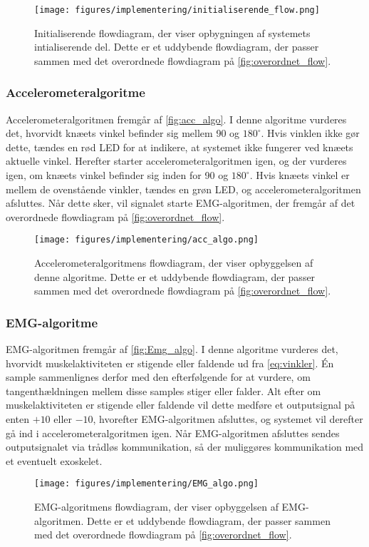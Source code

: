 \begin{figure}[H]
\centering
\texttt{[image: figures/implementering/initialiserende\_flow.png]}
\caption{Initialiserende flowdiagram, der viser opbygningen af systemets intialiserende del. Dette er et uddybende flowdiagram, der passer sammen med det overordnede flowdiagram på \autoref{fig:overordnet_flow}.}
\label{fig:initialiserende_flow}
\end{figure}

\subsubsection{Accelerometeralgoritme}
Accelerometeralgoritmen fremgår af \autoref{fig:acc_algo}. I denne algoritme vurderes det, hvorvidt knæets vinkel befinder sig mellem 90 og $180^{\circ}$. Hvis vinklen ikke gør dette, tændes en rød LED for at indikere, at systemet ikke fungerer ved knæets aktuelle vinkel. Herefter starter accelerometeralgoritmen igen, og der vurderes igen, om knæets vinkel befinder sig inden for 90 og $180^{\circ}$. Hvis knæets vinkel er mellem de ovenstående vinkler, tændes en grøn LED, og accelerometeralgoritmen afsluttes. Når dette sker, vil signalet starte EMG-algoritmen, der fremgår af det overordnede flowdiagram på \autoref{fig:overordnet_flow}.

\begin{figure}[H]
\centering
\texttt{[image: figures/implementering/acc\_algo.png]}
\caption{Accelerometeralgoritmens flowdiagram, der viser opbyggelsen af denne algoritme. Dette er et uddybende flowdiagram, der passer sammen med det overordnede flowdiagram på \autoref{fig:overordnet_flow}.}
\label{fig:acc_algo}
\end{figure}

\subsubsection{EMG-algoritme}
EMG-algoritmen fremgår af \autoref{fig:Emg_algo}. 
I denne algoritme vurderes det, hvorvidt muskelaktiviteten er stigende eller faldende ud fra \autoref{eq:vinkler}. 
Én sample sammenlignes derfor med den efterfølgende for at vurdere, om tangenthældningen mellem disse samples stiger eller falder. Alt efter om muskelaktiviteten er stigende eller faldende vil dette medføre et outputsignal på enten $+10$ eller $-10$, hvorefter EMG-algoritmen afsluttes, og systemet vil derefter gå ind i accelerometeralgoritmen igen. Når EMG-algoritmen afsluttes sendes outputsignalet via trådløs kommunikation, så der muliggøres kommunikation med et eventuelt exoskelet. 

\begin{figure}[H]
\centering
\texttt{[image: figures/implementering/EMG\_algo.png]}
\caption{EMG-algoritmens flowdiagram, der viser opbyggelsen af EMG-algoritmen. Dette er et uddybende flowdiagram, der passer sammen med det overordnede flowdiagram på \autoref{fig:overordnet_flow}.}
\label{fig:Emg_algo}
\end{figure}

